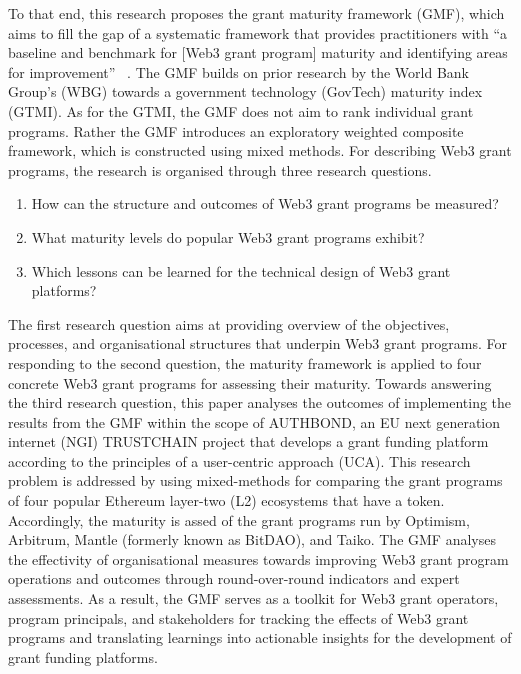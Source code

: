 \documentclass[conference]{IEEEtran}
\begin{document}
To that end, this research proposes the grant maturity framework (GMF), which aims to fill the gap of a systematic framework that provides practitioners with ``a baseline and benchmark for [Web3 grant program] maturity and identifying areas for improvement''~ \cite{dener_govtech_2021}. The GMF builds on prior research by the World Bank Group’s (WBG) towards a government technology (GovTech) maturity index (GTMI). As for the GTMI, the GMF does not aim to rank individual grant programs. Rather the GMF introduces an exploratory weighted composite framework, which is constructed using mixed methods. For describing Web3 grant programs, the research is organised through three research questions.

\begin{enumerate}
\item How can the structure and outcomes of Web3 grant programs be measured?
\item What maturity levels do popular Web3 grant programs exhibit?
\item Which lessons can be learned for the technical design of Web3 grant platforms?
\end{enumerate}

The first research question aims at providing overview of the objectives, processes, and organisational structures that underpin Web3 grant programs. For responding to the second question, the maturity framework is applied to four concrete Web3 grant programs for assessing their maturity. Towards answering the third research question, this paper analyses the outcomes of implementing the results from the GMF within the scope of  AUTHBOND, an EU next generation internet (NGI) TRUSTCHAIN project that develops a grant funding platform according to the principles of a user-centric approach (UCA). This research problem is addressed by using mixed-methods for comparing the grant programs of four popular Ethereum layer-two (L2) ecosystems that have a token. Accordingly, the maturity is assed of the grant programs run by Optimism, Arbitrum, Mantle (formerly known as BitDAO), and Taiko. The GMF analyses the effectivity of organisational measures towards improving Web3 grant program operations and outcomes through round-over-round indicators and expert assessments. As a result, the GMF serves as a toolkit for Web3 grant operators, program principals, and stakeholders for tracking the effects of Web3 grant programs and translating learnings into actionable insights for the development of grant funding platforms.
\end{document}
